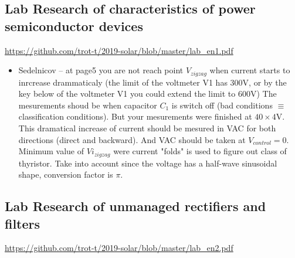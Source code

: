\documentclass[a4paper,landscape,11pt]{article}
\begin{document}
\subsection{Lab  Research of characteristics of power semiconductor devices}
\url{https://github.com/trot-t/2019-solar/blob/master/lab_en1.pdf}
\begin{itemize}
\item Sedelnicov -- at page5 you are not reach point $V_{zigzag}$ when current starts to inrcrease drammaticaly (the limit of the voltmeter V1 has 300V, or by the key below of the voltmeter V1 you could extend the limit to 600V)
The mesurements shoud be when capacitor $C_1$ is switch off (bad conditions $\equiv$ classification conditions). But your mesurements were finished at $40\times 4$V.
This dramatical increase of current should be mesured in VAC for both directions (direct and backward). And VAC should be taken at $V_{control}=0$.
Minimum value of $Vi_{zigzag}$ were current "folds" is used to figure out class of thyristor. 
Take into account since the voltage has a half-wave sinusoidal shape, conversion factor is $\pi$.
\end{itemize}


\subsection{Lab  Research of unmanaged rectifiers and filters}
\url{https://github.com/trot-t/2019-solar/blob/master/lab_en2.pdf}
\end{document}
